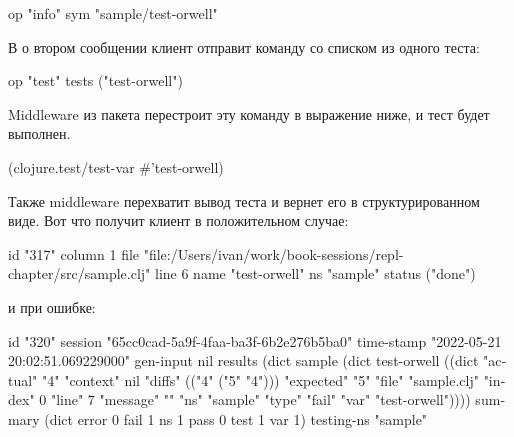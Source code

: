 \begin{english}
  \begin{text}
  op   "info"
  sym  "sample/test-orwell"
  \end{text}
\end{english}
В
о втором сообщении клиент отправит команду  со списком из одного теста:

\begin{english}
  \begin{text}
  op     "test"
  tests  ("test-orwell")
  \end{text}
\end{english}

Middleware из пакета  перестроит эту команду в выражение ниже, и тест будет выполнен.

\begin{english}
  \begin{clojure}
(clojure.test/test-var #'test-orwell)
  \end{clojure}
\end{english}

Также middleware перехватит вывод теста и вернет его в структурированном виде. Вот что получит клиент в положительном случае:

\begin{english}
  \begin{text}
  id      "317"
  column  1
  file    "file:/Users/ivan/work/book-sessions/repl-chapter/src/sample.clj"
  line    6
  name    "test-orwell"
  ns      "sample"
  status  ("done")
  \end{text}
\end{english}

и при ошибке:

\begin{english}
  \begin{text}
  id         "320"
  session    "65cc0cad-5a9f-4faa-ba3f-6b2e276b5ba0"
  time-stamp "2022-05-21 20:02:51.069229000"
  gen-input  nil
  results    (dict
               sample (dict
                        test-orwell ((dict "actual" "4\n" "context" nil "diffs"
       (("4\n"
         ("5\n" "4\n")))
       "expected" "5\n" "file" "sample.clj" "index" 0 "line" 7 "message" "" "ns" "sample" "type" "fail" "var" "test-orwell"))))
  summary    (dict
               error 0
               fail  1
               ns    1
               pass  0
               test  1
               var   1)
  testing-ns "sample"
  \end{text}
\end{english}

